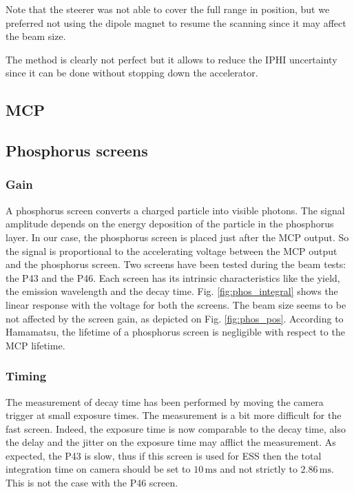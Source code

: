 \begin{refsection}

  Note that the steerer was not able to cover the full range in position, but we preferred not using the dipole magnet to resume the scanning since it may affect the beam size.

  The method is clearly not perfect but it allows to reduce the IPHI uncertainty since it can be done without stopping down the accelerator.

  \subsection{MCP}

  \subsection{Phosphorus screens}
  \subsubsection{Gain}
  A phosphorus screen converts a charged particle into visible photons.
  The signal amplitude depends on the energy deposition of the particle in the phosphorus layer. In our case, the phosphorus screen is placed just after the MCP output. So the signal is proportional to the accelerating voltage between the MCP output and the phosphorus screen. Two screens have been tested during the beam tests: the P43 and the P46. Each screen has its intrinsic characteristics like the yield, the emission wavelength and the decay time. Fig. \ref{fig:phos_integral} shows the linear response with the voltage for both the screens. The beam size seems to be not affected by the screen gain, as depicted on Fig. \ref{fig:phos_pos}. According to Hamamatsu, the lifetime of a phosphorus screen is negligible with respect to the MCP lifetime.

  
  

  \subsubsection{Timing}
  The measurement of decay time has been performed by moving the camera trigger at small exposure times. The measurement is a bit more difficult for the fast screen. Indeed, the exposure time is now comparable to the decay time, also the delay and the jitter on the exposure time may afflict the measurement. As expected, the P43 is slow, thus if this screen is used for ESS then the total integration time on camera should be set to $10\,\mathrm{ms}$ and not strictly to $2.86\,\mathrm{ms}$. This is not the case with the P46 screen.
  


\end{refsection}
